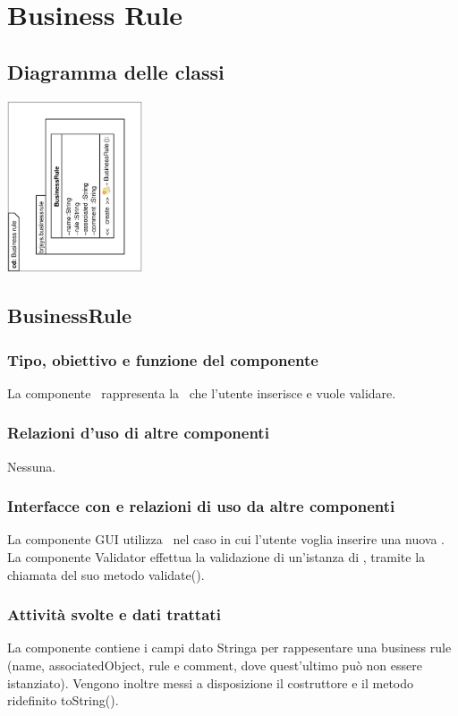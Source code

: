 \documentclass[11pt,titlepage,a4paper]{report}
\begin{document}
\section{Business Rule}
\subsection{Diagramma delle classi}
\begin{center}
\includegraphics[width=0.3\textwidth, angle=-90]{DiagrammaClassi/Businessrule.eps}
\end{center}
\subsection{BusinessRule}
\subsubsection{Tipo, obiettivo e funzione del componente}
La componente \BR\ rappresenta la \br\ che l'utente inserisce e vuole validare.
\subsubsection{Relazioni d'uso di altre componenti}
Nessuna.
\subsubsection{Interfacce con e relazioni di uso da altre componenti}
La componente GUI utilizza \BR\ nel caso in cui l'utente voglia inserire una nuova \br.
La componente Validator effettua la validazione di un'istanza di \BR, tramite la chiamata del suo metodo validate().
\subsubsection{Attivit\`a svolte e dati trattati}
La componente contiene i campi dato Stringa per rappesentare una business rule (name, associatedObject, rule e comment, dove quest'ultimo pu\`o non essere istanziato). Vengono inoltre messi a disposizione il costruttore e il metodo ridefinito toString().
\end{document}
